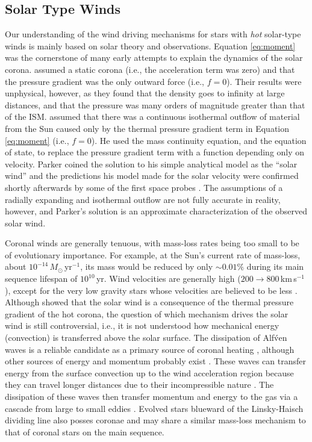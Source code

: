 \subsection{Solar Type Winds}\label{sec:1.4.2}
Our understanding of the wind driving mechanisms for stars with \textit{hot} solar-type winds is mainly based on solar theory and observations. Equation \ref{eq:moment} was the cornerstone of many early attempts to explain the dynamics of the solar corona. \cite{chapman_1957} assumed a static corona (i.e., the acceleration term was zero) and that the pressure gradient was the only outward force (i.e., $f=0$). Their results were unphysical, however, as they found that the density goes to infinity at large distances, and that the pressure was many orders of magnitude greater than that of the ISM. \cite{parker_1958} assumed that there was a continuous isothermal outflow of material from the Sun caused only by the thermal pressure gradient term in Equation \ref{eq:moment} (i.e., $f=0$). He used the mass continuity equation, and the equation of state, to replace the pressure gradient term with a function depending only on velocity. Parker coined the solution to his simple analytical model as the ``solar wind'' and the predictions his model made for the solar velocity were confirmed shortly afterwards by some of the first space probes \citep[e.g.,][]{neugebauer_1962}. The assumptions of a radially expanding and isothermal outflow are not fully accurate in reality, however, and Parker's solution is an approximate characterization of the observed solar wind.

Coronal winds are generally tenuous, with mass-loss rates being too small to be of evolutionary importance. For example, at the Sun's current rate of mass-loss, about $10^{-14}\,M_{\odot}$\,yr$^{-1}$, its mass would be reduced by only $\sim 0.01 \%$ during its main sequence lifespan of $10^{10}$\,yr. Wind velocities are generally high ($200 \rightarrow 800$\,km\,s$^{-1}$), except for the very low gravity stars whose velocities are believed to be less \cite{drake_1986}. Although \cite{parker_1958} showed that the solar wind is a consequence of the thermal pressure gradient of the hot corona, the question of which mechanism drives the solar wind is still controversial, i.e., it is not understood how mechanical energy (convection) is transferred above the solar surface. The dissipation of Alf\'ven waves is a reliable candidate as a primary source of coronal heating \citep{cranmer_2011}, although other sources of energy and momentum probably exist \cite[e.g.,][]{parker_1983,parker_1988}. These waves can transfer energy from the surface convection up to the wind acceleration region because they can travel longer distances due to their incompressible nature \citep[e.g.,][]{hollweg_1973}. The dissipation of these waves then transfer momentum and energy to the gas via a cascade from large to small eddies \citep{verdini_2007}. Evolved stars blueward of the Linsky-Haisch dividing line also posses coronae and may share a similar mass-loss mechanism to that of coronal stars on the main sequence. 

